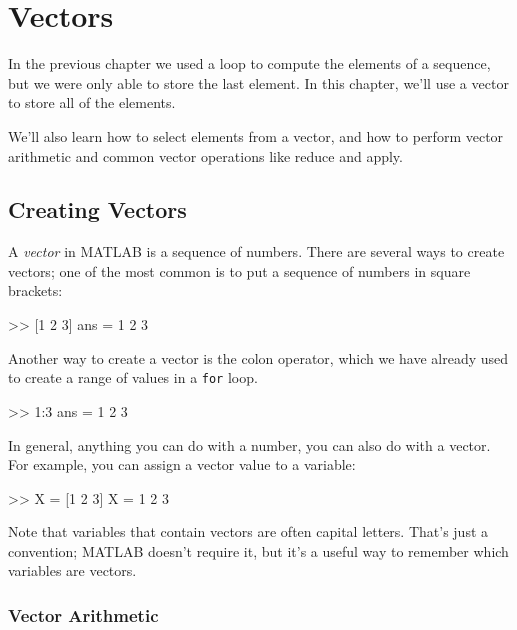 \chapter{Vectors}
\label{vectors}
\minitoc{}

In the previous chapter we used a loop to compute the elements of a sequence, but we were only able to store the last element.  In this chapter, we'll use a vector to store all of the elements.

We'll also learn how to select elements from a vector, and how to perform vector arithmetic and common vector operations like reduce and apply.


\section{Creating Vectors}


A \emph{vector} in MATLAB is a sequence of numbers.
There are several ways to create vectors; one of the most common is
to put a sequence of numbers in square brackets:

\begin{code}
>> [1 2 3]
ans = 1     2     3
\end{code}

Another way to create a vector is the colon operator, which we have already used to create a range of values in a {\tt for} loop.

\begin{code}
>> 1:3
ans = 1     2     3
\end{code}

In general, anything you can do with a number, you can also do with
a vector.  For example, you can assign a vector value to a variable:

\begin{code}
>> X = [1 2 3]
X = 1     2     3
\end{code}

Note that variables that contain vectors are often capital letters.
That's just a convention; MATLAB doesn't require it, but it's a useful way to remember which variables are vectors.


\subsection{Vector Arithmetic}
\label{elementwise}


